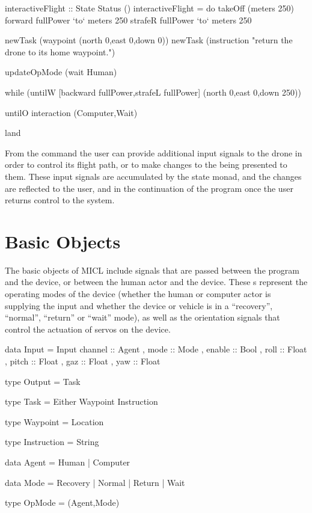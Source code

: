 \documentclass[11pt]{article}
\begin{document}
\begin{program}
interactiveFlight :: State Status ()
interactiveFlight = do takeOff (meters 250)
                       forward fullPower `to` meters 250
                       strafeR fullPower `to` meters 250

                       newTask (waypoint (north 0,east 0,down 0))
                       newTask (instruction "return the drone to its home waypoint.")

                       updateOpMode (wait Human)

                       while (untilW [backward fullPower,strafeL fullPower]
                              (north 0,east 0,down 250))

                         untilO interaction (Computer,Wait)

                       land
\end{program}

From the  command the user can provide additional input
signals to the drone in order to control its flight path, or to make changes
to the  being presented to them. These input signals are
accumulated by the state monad, and the changes are reflected to the user, and
in the continuation of the program once the user returns control to the
system.

\section{Basic Objects}
\label{sec:objects}
The basic objects of MICL include signals that are passed between the program
and the device, or between the human actor and the device. These
s represent the operating modes of the device (whether the human
or computer actor is supplying the input and whether the device or vehicle is
in a ``recovery'', ``normal'', ``return'' or ``wait'' mode), as well as the
orientation signals that control the actuation of servos on the device.

\begin{program}
data Input = Input { channel :: Agent
                   , mode :: Mode
                   , enable :: Bool
                   , roll :: Float
                   , pitch :: Float
                   , gaz :: Float
                   , yaw :: Float
                   }

type Output = Task
\end{program}

\begin{program}
type Task = Either Waypoint Instruction

type Waypoint = Location

type Instruction = String

data Agent = Human
           | Computer

data Mode = Recovery
          | Normal
          | Return
          | Wait

type OpMode = (Agent,Mode)
\end{program}
\end{document}
